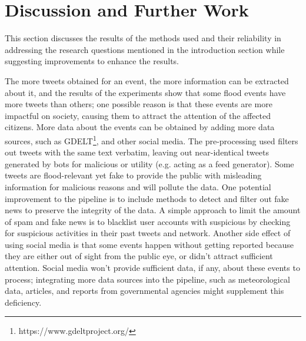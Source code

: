 \chapter{Discussion and Further Work}\label{sec:discussion_and_further_work}

This section discusses the results of the methods used and their reliability in addressing the
research questions mentioned in the introduction section while suggesting improvements to enhance
the results.

The more tweets obtained for an event, the more information can be extracted about it, and the
results of the experiments show that some flood events have more tweets than others; one possible
reason is that these events are more impactful on society, causing them to attract the attention of
the affected citizens. More data about the events can be obtained by adding more data sources, such
as \ac{GDELT}\footnote{https://www.gdeltproject.org/}, and other social media. The pre-processing
used filters out tweets with the same text verbatim, leaving out near-identical tweets generated by
bots for malicious or utility (e.g. acting as a feed generator). Some tweets are flood-relevant yet
fake to provide the public with misleading information for malicious reasons and will pollute the
data. One potential improvement to the pipeline is to include methods to detect and filter out fake
news to preserve the integrity of the data. A simple approach to limit the amount of spam and fake
news is to blacklist user accounts with suspicious by checking for suspicious activities in their
past tweets and network. Another side effect of using social media is that some events happen
without getting reported because they are either out of sight from the public eye, or didn't attract
sufficient attention. Social media won't provide sufficient data, if any, about these events to
process; integrating more data sources into the pipeline, such as meteorological data, articles, and
reports from governmental agencies might supplement this deficiency.

